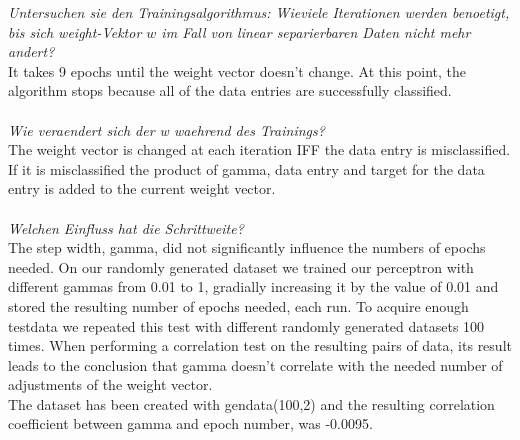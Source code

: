 \documentclass[12pt]{article}
\begin{document}
\textit{Untersuchen sie den Trainingsalgorithmus: Wieviele Iterationen werden benoetigt, bis sich weight-Vektor $w$ im Fall von linear separierbaren Daten nicht mehr andert?}
\\
It takes 9 epochs until the weight vector doesn't change. At this point, the algorithm stops because all of the data entries are successfully classified.
\\
\\
\textit{Wie veraendert sich der w waehrend des Trainings?}
\\
The weight vector is changed at each iteration IFF the data entry is misclassified. If it is misclassified the product of gamma, data entry and target for the data entry is added to the current weight vector.
\\
\\

\textit{Welchen Einfluss hat die Schrittweite?}
\\
The step width, gamma, did not significantly influence the numbers of epochs needed. On our randomly generated dataset we trained our perceptron with different gammas from 0.01 to 1, gradially increasing it by the value of 0.01 and stored the
resulting number of epochs needed, each run. To acquire enough testdata we repeated this test with different randomly generated datasets 100 times. When performing a correlation test on the resulting pairs of data, its result leads to the conclusion
that gamma doesn't correlate with the needed number of adjustments of the weight vector.\\
The dataset has been created with gendata(100,2) and the resulting correlation coefficient between gamma and epoch number, was -0.0095. 
\\
\\
\end{document}
